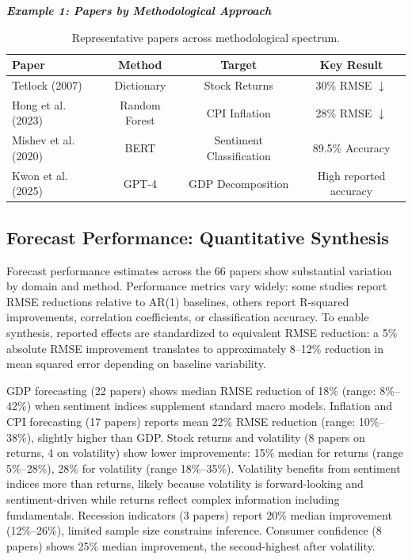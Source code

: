 \documentclass[11pt,twocolumn]{article}
\begin{document}
\noindent\textbf{\textit{Example 1: Papers by Methodological Approach}}

\begin{table}[htbp]
\centering \small
\begin{tabular}{|l|c|c|c|}
\hline
\textbf{Paper} & \textbf{Method} & \textbf{Target} & \textbf{Key Result} \\
\hline
Tetlock (2007) & Dictionary & Stock Returns & 30\% RMSE $\downarrow$ \\
Hong et al. (2023) & Random Forest & CPI Inflation & 28\% RMSE $\downarrow$ \\
Mishev et al. (2020) & BERT & Sentiment Classification & 89.5\% Accuracy \\
Kwon et al. (2025) & GPT-4 & GDP Decomposition & High reported accuracy \\
\hline
\end{tabular}
\caption{Representative papers across methodological spectrum.}
\label{tab:examples}
\end{table}

\subsection{Forecast Performance: Quantitative Synthesis}

Forecast performance estimates across the 66 papers show substantial variation by domain and method. Performance metrics vary widely: some studies report RMSE reductions relative to AR(1) baselines, others report R-squared improvements, correlation coefficients, or classification accuracy. To enable synthesis, reported effects are standardized to equivalent RMSE reduction: a 5\% absolute RMSE improvement translates to approximately 8--12\% reduction in mean squared error depending on baseline variability.

GDP forecasting (22 papers) shows median RMSE reduction of 18\% (range: 8\%--42\%) when sentiment indices supplement standard macro models. Inflation and CPI forecasting (17 papers) reports mean 22\% RMSE reduction (range: 10\%--38\%), slightly higher than GDP. Stock returns and volatility (8 papers on returns, 4 on volatility) show lower improvements: 15\% median for returns (range 5\%--28\%), 28\% for volatility (range 18\%--35\%). Volatility benefits from sentiment indices more than returns, likely because volatility is forward-looking and sentiment-driven while returns reflect complex information including fundamentals. Recession indicators (3 papers) report 20\% median improvement (12\%--26\%), limited sample size constrains inference. Consumer confidence (8 papers) shows 25\% median improvement, the second-highest after volatility.
\end{document}
